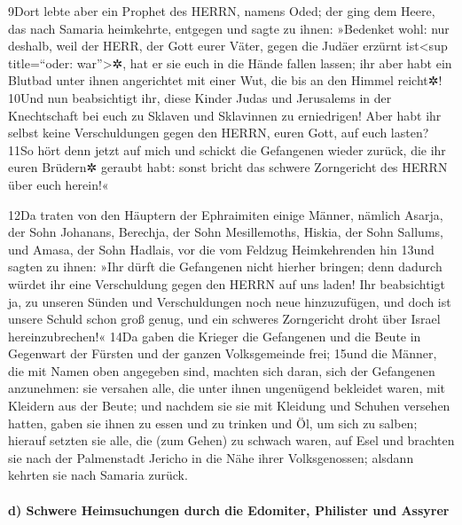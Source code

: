 9Dort lebte aber ein Prophet des HERRN, namens Oded; der ging dem Heere,
das nach Samaria heimkehrte, entgegen und sagte zu ihnen: »Bedenket
wohl: nur deshalb, weil der HERR, der Gott eurer Väter, gegen die Judäer
erzürnt ist\textless sup title=``oder: war''\textgreater✲, hat er sie
euch in die Hände fallen lassen; ihr aber habt ein Blutbad unter ihnen
angerichtet mit einer Wut, die bis an den Himmel reicht✲! 10Und nun
beabsichtigt ihr, diese Kinder Judas und Jerusalems in der Knechtschaft
bei euch zu Sklaven und Sklavinnen zu erniedrigen! Aber habt ihr selbst
keine Verschuldungen gegen den HERRN, euren Gott, auf euch lasten? 11So
hört denn jetzt auf mich und schickt die Gefangenen wieder zurück, die
ihr euren Brüdern✲ geraubt habt: sonst bricht das schwere Zorngericht
des HERRN über euch herein!«

12Da traten von den Häuptern der Ephraimiten einige Männer, nämlich
Asarja, der Sohn Johanans, Berechja, der Sohn Mesillemoths, Hiskia, der
Sohn Sallums, und Amasa, der Sohn Hadlais, vor die vom Feldzug
Heimkehrenden hin 13und sagten zu ihnen: »Ihr dürft die Gefangenen nicht
hierher bringen; denn dadurch würdet ihr eine Verschuldung gegen den
HERRN auf uns laden! Ihr beabsichtigt ja, zu unseren Sünden und
Verschuldungen noch neue hinzuzufügen, und doch ist unsere Schuld schon
groß genug, und ein schweres Zorngericht droht über Israel
hereinzubrechen!« 14Da gaben die Krieger die Gefangenen und die Beute in
Gegenwart der Fürsten und der ganzen Volksgemeinde frei; 15und die
Männer, die mit Namen oben angegeben sind, machten sich daran, sich der
Gefangenen anzunehmen: sie versahen alle, die unter ihnen ungenügend
bekleidet waren, mit Kleidern aus der Beute; und nachdem sie sie mit
Kleidung und Schuhen versehen hatten, gaben sie ihnen zu essen und zu
trinken und Öl, um sich zu salben; hierauf setzten sie alle, die (zum
Gehen) zu schwach waren, auf Esel und brachten sie nach der Palmenstadt
Jericho in die Nähe ihrer Volksgenossen; alsdann kehrten sie nach
Samaria zurück.

\hypertarget{d-schwere-heimsuchungen-durch-die-edomiter-philister-und-assyrer}{%
\paragraph{d) Schwere Heimsuchungen durch die Edomiter, Philister und
Assyrer}\label{d-schwere-heimsuchungen-durch-die-edomiter-philister-und-assyrer}}

